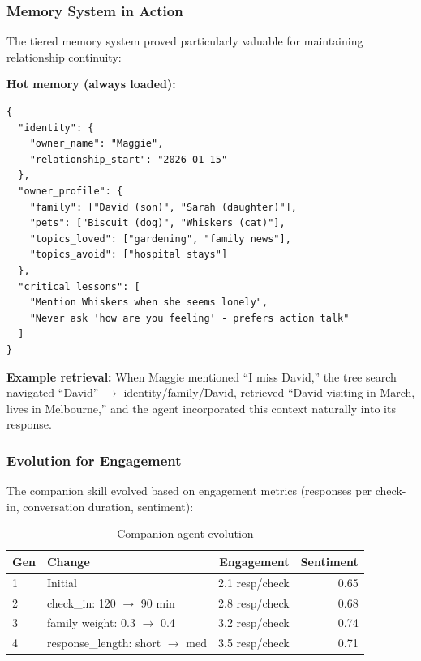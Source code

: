 \documentclass[conference]{IEEEtran}
\begin{document}
\subsubsection{Memory System in Action}

The tiered memory system proved particularly valuable for maintaining relationship continuity:

\textbf{Hot memory (always loaded):}
\begin{lstlisting}[style=jsoncode]
{
  "identity": {
    "owner_name": "Maggie",
    "relationship_start": "2026-01-15"
  },
  "owner_profile": {
    "family": ["David (son)", "Sarah (daughter)"],
    "pets": ["Biscuit (dog)", "Whiskers (cat)"],
    "topics_loved": ["gardening", "family news"],
    "topics_avoid": ["hospital stays"]
  },
  "critical_lessons": [
    "Mention Whiskers when she seems lonely",
    "Never ask 'how are you feeling' - prefers action talk"
  ]
}
\end{lstlisting}

\textbf{Example retrieval:} When Maggie mentioned ``I miss David,'' the tree search navigated ``David'' $\to$ identity/family/David, retrieved ``David visiting in March, lives in Melbourne,'' and the agent incorporated this context naturally into its response.

\subsubsection{Evolution for Engagement}

The companion skill evolved based on engagement metrics (responses per check-in, conversation duration, sentiment):

\begin{table}[h]
\centering
\caption{Companion agent evolution}
\label{tab:companion_evolution}
\begin{tabular}{llrr}
\toprule
\textbf{Gen} & \textbf{Change} & \textbf{Engagement} & \textbf{Sentiment} \\
\midrule
1 & Initial & 2.1 resp/check & 0.65 \\
2 & check\_in: 120 $\to$ 90 min & 2.8 resp/check & 0.68 \\
3 & family weight: 0.3 $\to$ 0.4 & 3.2 resp/check & 0.74 \\
4 & response\_length: short $\to$ med & 3.5 resp/check & 0.71 \\
\bottomrule
\end{tabular}
\end{table}
\end{document}
